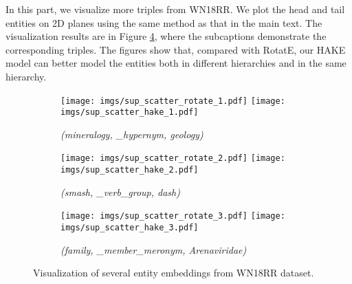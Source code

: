 \documentclass[letterpaper]{article} \usepackage{aaai20}  \usepackage{times}  \usepackage{helvet} \usepackage{courier}  \usepackage[hyphens]{url}  \usepackage{graphicx} \urlstyle{rm} \def\UrlFont{\rm}  \usepackage{graphicx}  \frenchspacing  \setlength{\pdfpagewidth}{8.5in}  \setlength{\pdfpageheight}{11in}
\begin{document}
In this part, we visualize more triples from WN18RR. We plot the head and tail entities on 2D planes using the same method as that in the main text. The visualization results are in Figure \ref{fig:scatter_modulus2}, where the subcaptions demonstrate the corresponding triples. The figures show that, compared with RotatE, our HAKE model can better model the entities both in different hierarchies and in the same hierarchy. 

\vspace{5mm}
\begin{figure}[!ht]
  \centering \begin{subfigure}[b]{0.4\textwidth}
  \centering
  \texttt{[image: imgs/sup\_scatter\_rotate\_1.pdf]}\hspace{4mm}
  \texttt{[image: imgs/sup\_scatter\_hake\_1.pdf]}
  \caption{\textit{(mineralogy, \_hypernym, geology)}}
  \label{fig:scatter_modulus_sub1}
\end{subfigure} 

\vspace{2mm}
\begin{subfigure}[b]{0.4\textwidth}
  \centering
  \texttt{[image: imgs/sup\_scatter\_rotate\_2.pdf]}\hspace{4mm}
  \texttt{[image: imgs/sup\_scatter\_hake\_2.pdf]}
  \caption{\textit{(smash, \_verb\_group, dash)}}
  \label{fig:scatter_modulus_sub2}
\end{subfigure} 

\vspace{2mm}
\begin{subfigure}[b]{0.4\textwidth}
  \centering
  \texttt{[image: imgs/sup\_scatter\_rotate\_3.pdf]}\hspace{4mm}
  \texttt{[image: imgs/sup\_scatter\_hake\_3.pdf]}
  \caption{\textit{(family, \_member\_meronym, Arenaviridae)}}
  \label{fig:scatter_modulus_sub3}
\end{subfigure} 
\caption{Visualization of several entity embeddings from WN18RR dataset.}
\label{fig:scatter_modulus2}
\end{figure}
\end{document}
